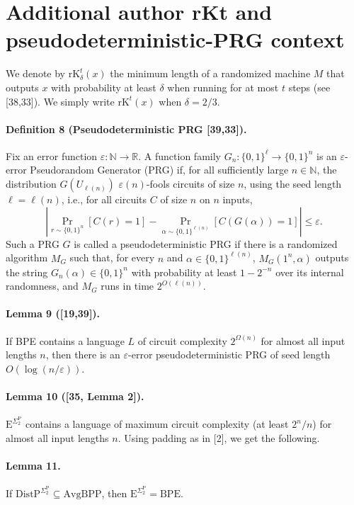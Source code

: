 \section*{Additional author rKt and pseudodeterministic-PRG context}
We denote by $\mathrm{rK}_\delta^t(x)$ the minimum length of a randomized machine $M$ that outputs $x$ with probability at least $\delta$ when running for at most $t$ steps (see [38,33]). We simply write $\mathrm{rK}^t(x)$ when $\delta=2/3$.
\paragraph{Definition 8 (Pseudodeterministic PRG [39,33]).} Fix an error function $\varepsilon:\mathbb N\to\mathbb R$. A function family $G_n:\{0,1\}^\ell\to\{0,1\}^n$ is an $\varepsilon$-error Pseudorandom Generator (PRG) if, for all sufficiently large $n\in\mathbb N$, the distribution $G(U_{\ell(n)})$ $\varepsilon(n)$-fools circuits of size $n$, using the seed length $\ell=\ell(n)$, i.e., for all circuits $C$ of size $n$ on $n$ inputs,
\[\left|\Pr_{r\sim\{0,1\}^n}[C(r)=1]-\Pr_{\alpha\sim\{0,1\}^{\ell(n)}}[C(G(\alpha))=1]\right|\leq\varepsilon.\]
Such a PRG $G$ is called a pseudodeterministic PRG if there is a randomized algorithm $M_G$ such that, for every $n$ and $\alpha\in\{0,1\}^{\ell(n)}$, $M_G(1^n,\alpha)$ outputs the string $G_n(\alpha)\in\{0,1\}^n$ with probability at least $1-2^{-n}$ over its internal randomness, and $M_G$ runs in time $2^{O(\ell(n))}$.
\paragraph{Lemma 9 ([19,39]).} If BPE contains a language $L$ of circuit complexity $2^{\Omega(n)}$ for almost all input lengths $n$, then there is an $\varepsilon$-error pseudodeterministic PRG of seed length $O(\log(n/\varepsilon))$.
\paragraph{Lemma 10 ([35, Lemma 2]).} $\mathrm E^{\Sigma_2^{\mathrm P}}$ contains a language of maximum circuit complexity (at least $2^n/n$) for almost all input lengths $n$.
Using padding as in [2], we get the following.
\paragraph{Lemma 11.} If $\mathrm{DistP}^{\Sigma_2^{\mathrm P}}\subseteq\mathrm{AvgBPP}$, then $\mathrm E^{\Sigma_2^{\mathrm P}}=\mathrm{BPE}$.
